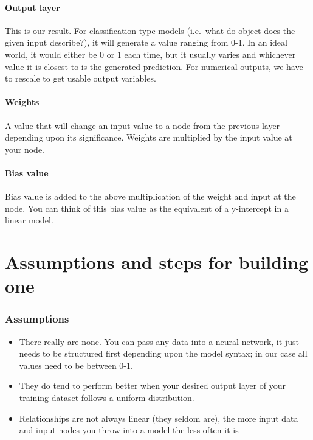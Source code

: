 \documentclass[
]{article}
\providecommand{\tightlist}{%
  \setlength{\itemsep}{0pt}\setlength{\parskip}{0pt}}
\begin{document}
\hypertarget{output-layer}{%
\paragraph{Output layer}\label{output-layer}}

This is our result. For classification-type models (i.e.~what do object
does the given input describe?), it will generate a value ranging from
0-1. In an ideal world, it would either be 0 or 1 each time, but it
usually varies and whichever value it is closest to is the generated
prediction. For numerical outputs, we have to rescale to get usable
output variables.

\hypertarget{weights}{%
\paragraph{Weights}\label{weights}}

A value that will change an input value to a node from the previous
layer depending upon its significance. Weights are multiplied by the
input value at your node.

\hypertarget{bias-value}{%
\paragraph{Bias value}\label{bias-value}}

Bias value is added to the above multiplication of the weight and input
at the node. You can think of this bias value as the equivalent of a
y-intercept in a linear model.

\hypertarget{assumptions-and-steps-for-building-one}{%
\section{Assumptions and steps for building
one}\label{assumptions-and-steps-for-building-one}}

\hypertarget{assumptions}{%
\subsubsection{Assumptions}\label{assumptions}}

\begin{itemize}
\tightlist
\item
  There really are none. You can pass any data into a neural network, it
  just needs to be structured first depending upon the model syntax; in
  our case all values need to be between 0-1.
\item
  They do tend to perform better when your desired output layer of your
  training dataset follows a uniform distribution.
\item
  Relationships are not always linear (they seldom are), the more input
  data and input nodes you throw into a model the less often it is
\end{itemize}
\end{document}
